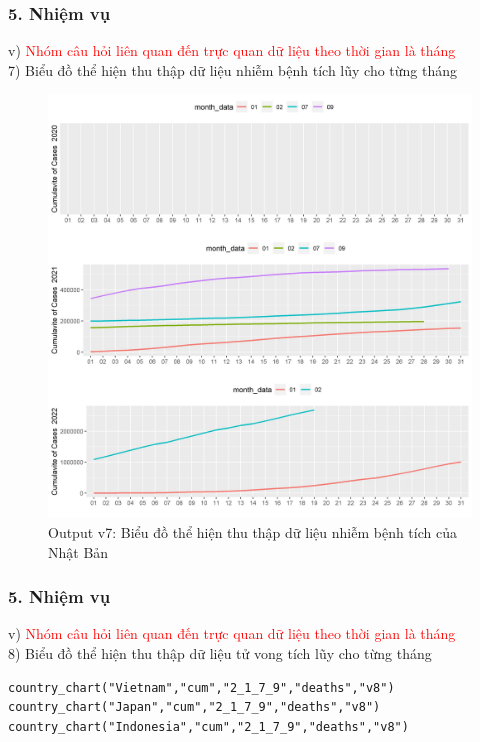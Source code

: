 \documentclass[english,10pt,table]{beamer}
\begin{document}
\begin{frame}[fragile]
\frametitle{5.  Nhiệm vụ}
v) \textcolor{red}{Nhóm câu hỏi liên quan đến trực quan dữ liệu theo thời gian là tháng}\\
    7) Biểu đồ thể hiện thu thập dữ liệu nhiễm bệnh tích lũy cho từng tháng
	\begin{figure}[h!]
	\begin{center}
		    \includegraphics[scale = 0.26]{Images/V/v7 Japan .jpeg}
		     \caption{Output v7: Biểu đồ thể hiện thu thập dữ liệu nhiễm bệnh tích của Nhật Bản}
		\end{center}
		\end{figure}
\end{frame}

\begin{frame}[fragile]
\frametitle{5.  Nhiệm vụ}
v) \textcolor{red}{Nhóm câu hỏi liên quan đến trực quan dữ liệu theo thời gian là tháng}\\
    8) Biểu đồ thể hiện thu thập dữ liệu tử vong tích lũy cho từng tháng
    \begin{lstlisting}[frame=single,basicstyle=\tiny]  
country_chart("Vietnam","cum","2_1_7_9","deaths","v8")
country_chart("Japan","cum","2_1_7_9","deaths","v8")
country_chart("Indonesia","cum","2_1_7_9","deaths","v8")
		\end{lstlisting}
\end{frame}
\end{document}
